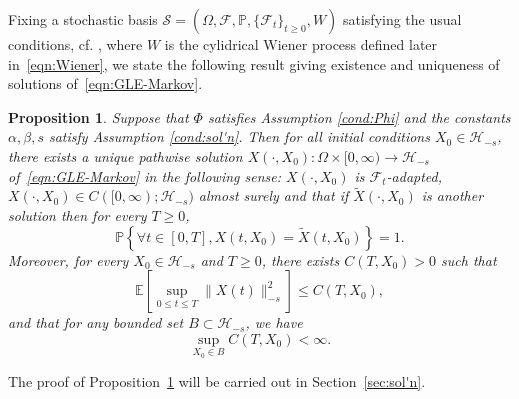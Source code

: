 \documentclass[11pt]{amsart}
\theoremstyle{definition}
\renewcommand{\H}{\mathcal{H}}
\newcommand{\E}[1]{\mathbb{E}\left[#1\right]}
\renewcommand{\P}[1]{\mathbb{P}\left\{#1\right\}}
\newcommand{\Pnone}{\mathbb{P}}
\newcommand{\wt}[1]{ \widetilde{#1} }
\theoremstyle{definition}
\theoremstyle{plain}
\newtheorem{proposition}[theorem]{Proposition}
\numberwithin{equation}{section}
\begin{document}
Fixing a stochastic basis $\mathcal{S}=\left(\Omega,\mathcal{F},\Pnone,\{\mathcal{F}_t\}_{t\geq 0},W\right)$ satisfying the usual conditions, cf. \cite{karatzas2012brownian}, where $W$ is the cylidrical Wiener process defined later in~\eqref{eqn:Wiener}, we state the following result giving existence and uniqueness of solutions of~\eqref{eqn:GLE-Markov}.
\begin{proposition} \label{prop:sol'n} Suppose that $\Phi$ satisfies Assumption \ref{cond:Phi} and the constants $\alpha, \beta, s$ satisfy Assumption \ref{cond:sol'n}. Then for all initial conditions $X_0\in \H_{-s}$, there exists a unique pathwise solution $X(\cdot,X_0):\Omega\times[0,\infty)\to\H_{-s}$ of~\eqref{eqn:GLE-Markov} in the following sense: $X(\cdot,X_0)$ is $\mathcal{F}_t$-adapted, $X(\cdot,X_0)\in C([0,\infty);\H_{-s})$ almost surely and that if $\wt{X}(\cdot,X_0)$ is another solution then for every $T\geq 0$,
\begin{displaymath}
\P{\forall t\in[0,T], X(t,X_0)=\wt{X}(t,X_0)}=1.
\end{displaymath}
Moreover, for every $X_0 \in \H_{-s}$ and $T\geq 0$, there exists $C(T,X_0)>0$ such that
 \begin{equation} \label{ineq:strong-sol'n}
 \E{\sup_{0\leq t\leq T }\|X(t)\|_{-s}^2}\leq C(T,X_0),
 \end{equation}
and that for any bounded set $B\subset\H_{-s}$, we have 
\begin{equation}\label{ineq:strong-sol'n:sup}
\sup_{X_0\in B}C(T,X_0)<\infty.
\end{equation}
\end{proposition}
The proof of Proposition~\ref{prop:sol'n} will be carried out in Section~\ref{sec:sol'n}.  
\end{document}
